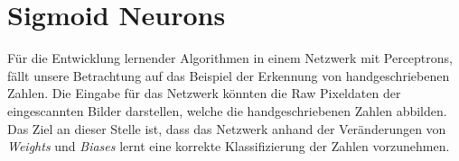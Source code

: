 \section{Sigmoid Neurons}
Für die Entwicklung lernender Algorithmen in einem Netzwerk mit Perceptrons, fällt unsere Betrachtung auf das Beispiel der Erkennung von handgeschriebenen Zahlen. Die Eingabe für das Netzwerk könnten die Raw Pixeldaten der eingescannten Bilder darstellen, welche die handgeschriebenen Zahlen abbilden. Das Ziel an dieser Stelle ist, dass das Netzwerk anhand der Veränderungen von \textit{Weights} und \textit{Biases} lernt eine korrekte Klassifizierung der Zahlen vorzunehmen.